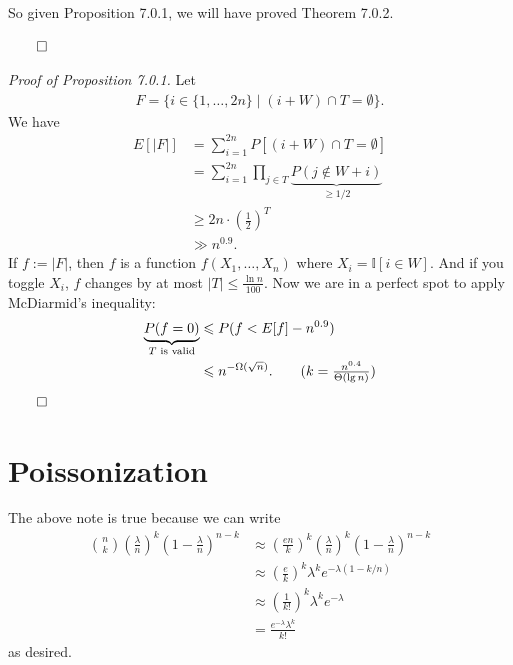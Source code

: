 \documentclass{report}
\begin{document}
So given Proposition 7.0.1, we will have proved Theorem 7.0.2.

\hfill $\qed$

\noindent \textit{Proof of Proposition 7.0.1.} Let 
\begin{align*}
    F = \{ i \in \{1, \ldots, 2n \} \mid (i + W) \cap T  = \emptyset \}.
\end{align*}
We have 
\begin{align*}
    E[|F|] &= \sum_{i=1}^{2n} P[(i + W) \cap T = \emptyset] \\
    &= \sum_{i=1}^{2n} \prod_{j \in T} \underbrace{P(j \notin W + i)}_{\geq 1/2} \\
    &\geq 2n \cdot \left( \frac 12 \right)^{T} \\
    &\gg n^{0.9}.
\end{align*}
If $f := |F|$, then $f$ is a function $f(X_1, \ldots, X_n)$ where $X_i = \mathbb I[i  \in W]$. And if you toggle $X_i$, $f$ changes by at most $|T| \leq \frac{\ln n}{100}$. Now we are in a perfect spot to apply McDiarmid's inequality:
\begin{align*}
    \underbrace{P(f = 0)}_{T \text{ is valid}} &\leq P(f < E[f] - n^{0.9}) \\
    &\leq n^{-\Omega(\sqrt n)}. \tag{$k = \frac{n^{0.4}}{\Theta (\lg n)}$}
\end{align*}
\hfill $\qed$
\newpage
\chapter{Poissonization}
The above note is true because we can write 
\begin{align*}
    \binom nk \left(\frac \lambda n \right)^k \left( 1- \frac \lambda n \right)^{n-k} &\approx  \left(\frac{en}{k}\right)^k \left(\frac \lambda n\right)^k \left( 1 - \frac \lambda n \right)^{n-k} \\
    &\approx \left(\frac ek \right)^k \lambda^k e^{-\lambda(1 - k/n)} \\
    &\approx \left( \frac{1}{k!}\right)^k \lambda^k e^{-\lambda} \\
    &= \frac{e^{-\lambda}\lambda^k }{k!}
\end{align*}
as desired.
\end{document}

